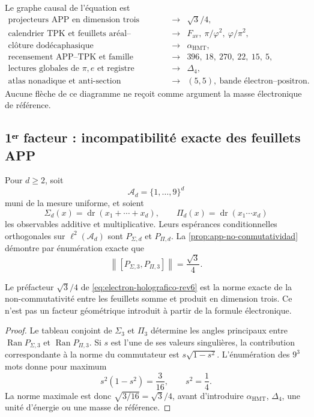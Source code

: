 Le graphe causal de l'équation est
\[
\begin{array}{ccl}
\text{projecteurs APP en dimension trois}
&\longrightarrow& \sqrt3/4,\\[2mm]
\text{calendrier TPK et feuillets aréal--volumétrique}
&\longrightarrow&
F_{\mathrm{av}},\ \pi/\varphi^2,\
\varphi/\pi^2,\\[2mm]
\text{clôture dodécaphasique}
&\longrightarrow&\alpha_{\mathrm{HMT}},\\[2mm]
\text{recensement APP--TPK et famille électronique}
&\longrightarrow&396,\ 18,\ 270,\ 22,\ 15,\ 5,\\[2mm]
\text{lectures globales de }\pi,e\text{ et registre}
&\longrightarrow&\Delta_4,\\[2mm]
\text{atlas nonadique et anti-section}
&\longrightarrow&(5,5),\
\text{bande électron--positron}.
\end{array}
\]
Aucune flèche de ce diagramme ne reçoit comme argument la masse électronique
de référence.

\subsection{1ᵉʳ facteur : incompatibilité exacte des feuillets APP}

Pour \(d\geq2\), soit
\[
 \mathscr A_d=\{1,\ldots,9\}^d
\]
muni de la mesure uniforme, et soient
\[
 \Sigma_d(x)=\operatorname{dr}(x_1+\cdots+x_d),
 \qquad
 \Pi_d(x)=\operatorname{dr}(x_1\cdots x_d)
\]
les observables additive et multiplicative. Leurs espérances conditionnelles
orthogonales sur \(\ell^2(\mathscr A_d)\) sont
\(P_{\Sigma,d}\) et \(P_{\Pi,d}\). La
\cref{prop:app-no-conmutatividad} démontre par énumération exacte que
\[
 \left\|[P_{\Sigma,3},P_{\Pi,3}]\right\|
 =\frac{\sqrt3}{4}.
\]

\begin{proposition}
\label{prop:prefactor-app-electron-rev6}
Le préfacteur \(\sqrt3/4\) de
\cref{eq:electron-holografico-rev6} est la norme exacte de la
non-commutativité entre les feuillets somme et produit en dimension trois.
Ce n'est pas un facteur géométrique introduit à partir de la formule électronique.
\end{proposition}

\begin{proof}
Le tableau conjoint de \(\Sigma_3\) et \(\Pi_3\) détermine les angles
principaux entre
\(\operatorname{Ran}P_{\Sigma,3}\) et
\(\operatorname{Ran}P_{\Pi,3}\). Si \(s\) est l'une de ses valeurs
singulières, la contribution correspondante à la norme du commutateur est
\(s\sqrt{1-s^2}\). L'énumération des \(9^3\) mots donne pour maximum
\[
 s^2(1-s^2)=\frac3{16},
 \qquad s^2=\frac14.
\]
La norme maximale est donc \(\sqrt{3/16}=\sqrt3/4\), avant
d'introduire \(\alpha_{\mathrm{HMT}}\), \(\Delta_4\), une unité d'énergie
ou une masse de référence.
\end{proof}

